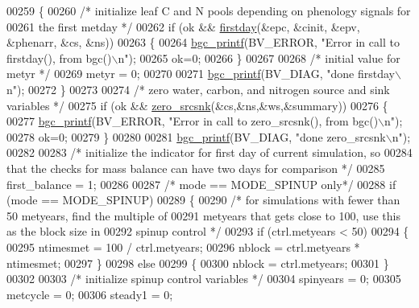 \begin{DoxyCode}
00259     \{
00260         \textcolor{comment}{/* initialize leaf C and N pools depending on phenology signals for}
00261 \textcolor{comment}{        the first metday */}
00262         \textcolor{keywordflow}{if} (ok && \hyperlink{firstday_8c_abb6c5cdd7fcae478726423f980f8a3b6}{firstday}(&epc, &cinit, &epv, &phenarr, &cs, &ns))
00263         \{
00264             \hyperlink{bgc__io_8c_af287cce6e2aede1ce337de9319e80d0d}{bgc\_printf}(BV\_ERROR, \textcolor{stringliteral}{"Error in call to firstday(), from bgc()\(\backslash\)n"});
00265             ok=0;
00266         \}
00267         
00268         \textcolor{comment}{/* initial value for metyr */}
00269         metyr = 0;
00270         
00271         \hyperlink{bgc__io_8c_af287cce6e2aede1ce337de9319e80d0d}{bgc\_printf}(BV\_DIAG, \textcolor{stringliteral}{"done firstday\(\backslash\)n"});
00272     \}
00273 
00274     \textcolor{comment}{/* zero water, carbon, and nitrogen source and sink variables */}
00275     \textcolor{keywordflow}{if} (ok && \hyperlink{zero__srcsnk_8c_ad1fe85d82246f51079a60a61cf591a9c}{zero\_srcsnk}(&cs,&ns,&ws,&summary))
00276     \{
00277         \hyperlink{bgc__io_8c_af287cce6e2aede1ce337de9319e80d0d}{bgc\_printf}(BV\_ERROR, \textcolor{stringliteral}{"Error in call to zero\_srcsnk(), from bgc()\(\backslash\)n"});
00278         ok=0;
00279     \}
00280 
00281     \hyperlink{bgc__io_8c_af287cce6e2aede1ce337de9319e80d0d}{bgc\_printf}(BV\_DIAG, \textcolor{stringliteral}{"done zero\_srcsnk\(\backslash\)n"});
00282     
00283     \textcolor{comment}{/* initialize the indicator for first day of current simulation, so}
00284 \textcolor{comment}{    that the checks for mass balance can have two days for comparison */}
00285     first\_balance = 1;
00286 
00287     \textcolor{comment}{/* mode == MODE\_SPINUP only*/}
00288     \textcolor{keywordflow}{if} (mode == MODE\_SPINUP)
00289     \{
00290         \textcolor{comment}{/* for simulations with fewer than 50 metyears, find the multiple of}
00291 \textcolor{comment}{        metyears that gets close to 100, use this as the block size in}
00292 \textcolor{comment}{        spinup control */}
00293         \textcolor{keywordflow}{if} (ctrl.metyears < 50)
00294         \{
00295             ntimesmet = 100 / ctrl.metyears;
00296             nblock = ctrl.metyears * ntimesmet;
00297         \}
00298         \textcolor{keywordflow}{else}
00299         \{
00300             nblock = ctrl.metyears;
00301         \}
00302 
00303         \textcolor{comment}{/* initialize spinup control variables */}
00304         spinyears = 0;
00305       metcycle = 0;
00306       steady1 = 0;

\end{DoxyCode}
